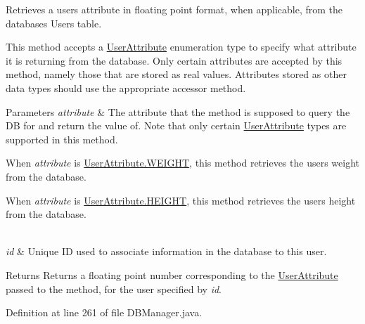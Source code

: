 Retrieves a user\textquotesingle{}s attribute in floating point format, when applicable, from the database\textquotesingle{}s Users table.

This method accepts a \mbox{\hyperlink{enumcom_1_1activitytracker_1_1_user_attribute}{User\+Attribute}} enumeration type to specify what attribute it is returning from the database. Only certain attributes are accepted by this method, namely those that are stored as real values. Attributes stored as other data types should use the appropriate accessor method.


\begin{DoxyParams}{Parameters}
{\em attribute} & The attribute that the method is supposed to query the DB for and return the value of. Note that only certain \mbox{\hyperlink{enumcom_1_1activitytracker_1_1_user_attribute}{User\+Attribute}} types are supported in this method.
\begin{DoxyItemize}
\item When {\itshape attribute} is \mbox{\hyperlink{enumcom_1_1activitytracker_1_1_user_attribute_a024206b0dc3261031ef586b3f0fd530c}{User\+Attribute.\+W\+E\+I\+G\+HT}}, this method retrieves the user\textquotesingle{}s weight from the database.
\item When {\itshape attribute} is \mbox{\hyperlink{enumcom_1_1activitytracker_1_1_user_attribute_a0a80ca5cce8eb4494c2128bd4291a5b7}{User\+Attribute.\+H\+E\+I\+G\+HT}}, this method retrieves the user\textquotesingle{}s height from the database. 
\end{DoxyItemize}\\
\hline
{\em id} & Unique ID used to associate information in the database to this user.\\
\hline
\end{DoxyParams}
\begin{DoxyReturn}{Returns}
Returns a floating point number corresponding to the \mbox{\hyperlink{enumcom_1_1activitytracker_1_1_user_attribute}{User\+Attribute}} passed to the method, for the user specified by {\itshape id}. 
\end{DoxyReturn}


Definition at line 261 of file D\+B\+Manager.\+java.


